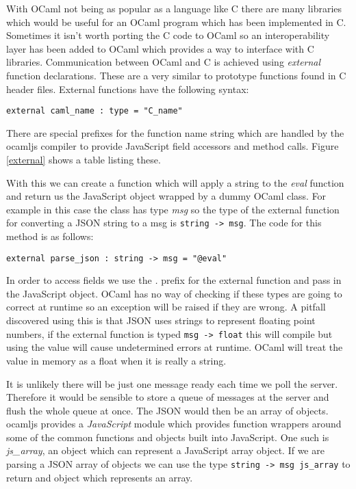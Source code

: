 With OCaml not being as popular as a language like C there are many libraries which would be useful for an OCaml program which has been implemented in C. Sometimes it isn't worth porting the C code to OCaml so an interoperability layer has been added to OCaml which provides a way to interface with C libraries. Communication between OCaml and C is achieved using \emph{external} function declarations. These are a very similar to prototype functions found in C header files. External functions have the following syntax:

\begin{center}
\texttt{external caml\_name : type = "C\_name"}
\end{center}

There are special prefixes for the function name string which are handled by the ocamljs compiler to provide JavaScript field accessors and method calls. Figure \ref{external} shows a table listing these.

With this we can create a function which will apply a string to the \emph{eval} function and return us the JavaScript object wrapped by a dummy OCaml class. For example in this case the class has type \emph{msg} so the type of the external function for converting a JSON string to a msg is \texttt{string -> msg}. The code for this method is as follows:

\begin{center}
\texttt{external parse\_json : string -> msg = "@eval"}
\end{center}

In order to access fields we use the \emph{.} prefix for the external function and pass in the JavaScript object. OCaml has no way of checking if these types are going to correct at runtime so an exception will be raised if they are wrong. A pitfall discovered using this is that JSON uses strings to represent floating point numbers, if the external function is typed \texttt{msg -> float} this will compile but using the value will cause undetermined errors at runtime. OCaml will treat the value in memory as a float when it is really a string.

It is unlikely there will be just one message ready each time we poll the server. Therefore it would be sensible to store a queue of messages at the server and flush the whole queue at once. The JSON would then be an array of objects. ocamljs provides a \emph{JavaScript} module which provides function wrappers around some of the common functions and objects built into JavaScript. One such is \emph{js\_array}, an object which can represent a JavaScript array object. If we are parsing a JSON array of objects we can use the type \texttt{string -> msg js\_array} to return and object which represents an array.

